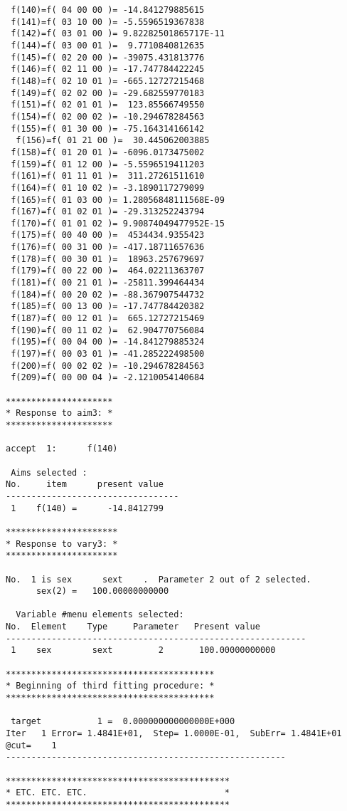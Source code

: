 \begin{footnotesize}
\begin{verbatim}
 f(140)=f( 04 00 00 )= -14.841279885615
 f(141)=f( 03 10 00 )= -5.5596519367838
 f(142)=f( 03 01 00 )= 9.82282501865717E-11
 f(144)=f( 03 00 01 )=  9.7710840812635
 f(145)=f( 02 20 00 )= -39075.431813776
 f(146)=f( 02 11 00 )= -17.747784422245
 f(148)=f( 02 10 01 )= -665.12727215468
 f(149)=f( 02 02 00 )= -29.682559770183
 f(151)=f( 02 01 01 )=  123.85566749550
 f(154)=f( 02 00 02 )= -10.294678284563
 f(155)=f( 01 30 00 )= -75.164314166142
  f(156)=f( 01 21 00 )=  30.445062003885
 f(158)=f( 01 20 01 )= -6096.0173475002
 f(159)=f( 01 12 00 )= -5.5596519411203
 f(161)=f( 01 11 01 )=  311.27261511610
 f(164)=f( 01 10 02 )= -3.1890117279099
 f(165)=f( 01 03 00 )= 1.28056848111568E-09
 f(167)=f( 01 02 01 )= -29.313252243794
 f(170)=f( 01 01 02 )= 9.90874049477952E-15
 f(175)=f( 00 40 00 )=  4534434.9355423
 f(176)=f( 00 31 00 )= -417.18711657636
 f(178)=f( 00 30 01 )=  18963.257679697
 f(179)=f( 00 22 00 )=  464.02211363707
 f(181)=f( 00 21 01 )= -25811.399464434
 f(184)=f( 00 20 02 )= -88.367907544732
 f(185)=f( 00 13 00 )= -17.747784420382
 f(187)=f( 00 12 01 )=  665.12727215469
 f(190)=f( 00 11 02 )=  62.904770756084
 f(195)=f( 00 04 00 )= -14.841279885324
 f(197)=f( 00 03 01 )= -41.285222498500
 f(200)=f( 00 02 02 )= -10.294678284563
 f(209)=f( 00 00 04 )= -2.1210054140684

*********************
* Response to aim3: *
*********************

accept  1:      f(140)

 Aims selected :
No.     item      present value
----------------------------------
 1    f(140) =      -14.8412799

**********************
* Response to vary3: *
**********************

No.  1 is sex      sext    .  Parameter 2 out of 2 selected.
      sex(2) =   100.00000000000

  Variable #menu elements selected:
No.  Element    Type     Parameter   Present value
-----------------------------------------------------------
 1    sex        sext         2       100.00000000000

*****************************************
* Beginning of third fitting procedure: *
*****************************************

 target           1 =  0.000000000000000E+000
Iter   1 Error= 1.4841E+01,  Step= 1.0000E-01,  SubErr= 1.4841E+01 @cut=    1
-------------------------------------------------------

********************************************
* ETC. ETC. ETC.                           *
********************************************


\end{verbatim}
\end{footnotesize}
